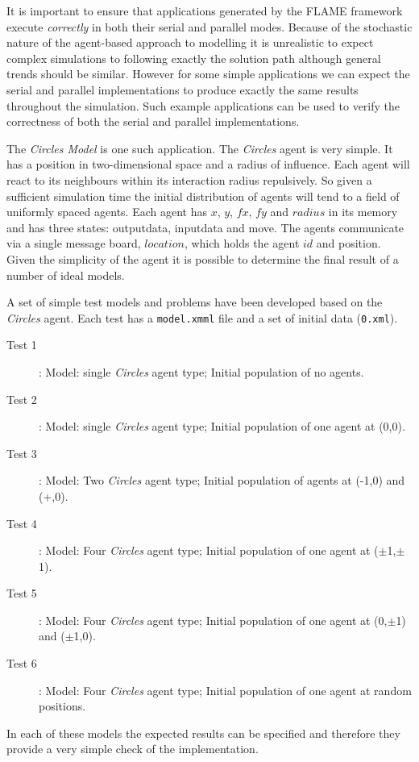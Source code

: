 \label{app:flameverification}
It is important to ensure that applications generated by the FLAME framework execute \textsl{correctly} in both their serial and parallel modes. Because of the stochastic nature of the agent-based approach to modelling it is unrealistic to expect complex simulations to following exactly the solution path although general trends should be similar. However for some simple applications we can expect the serial and parallel implementations to produce exactly the same results throughout the simulation. Such example applications can be used to verify the correctness of both the serial and parallel implementations.

The \textsl{Circles Model} is one such application. The \textsl{Circles} agent is very simple. It has a position in two-dimensional space and a radius of influence. Each agent will react to its neighbours within its interaction radius repulsively. So given a sufficient simulation time the initial distribution of agents will tend to a field of uniformly spaced agents. Each agent has $x$, $y$, $fx$, $fy$ and $radius$ in its memory and has three states: outputdata, inputdata and move. The agents communicate via a single message board, $location$, which holds the agent $id$ and position. Given the simplicity of the agent it is possible to determine the final result of a number of ideal models.

A set of simple test models and problems have been developed based on the \textsl{Circles} agent. Each test has a \texttt{model.xmml} file and a set of initial data (\texttt{0.xml}).
\begin{description}
 \item [Test 1]: Model: single \textsl{Circles} agent type; Initial population of no agents.
 \item [Test 2]: Model: single \textsl{Circles} agent type; Initial population of one agent at (0,0).
	\item [Test 3]: Model: Two \textsl{Circles} agent type; Initial population of agents at (-1,0) and (+,0).
	\item [Test 4]: Model: Four \textsl{Circles} agent type; Initial population of one agent at ($\pm$1,$\pm$1).
	\item [Test 5]: Model: Four \textsl{Circles} agent type; Initial population of one agent at (0,$\pm$1) and ($\pm$1,0).
	\item [Test 6]: Model: Four \textsl{Circles} agent type; Initial population of one agent at random positions.
	\end{description}
In each of these models the expected results can be specified and therefore they provide a very simple check of the implementation.

